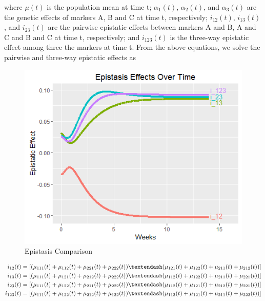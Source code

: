 \documentclass[11pt,]{book}
\theoremstyle{definition}
\theoremstyle{definition}
\theoremstyle{remark}
\begin{document}
where \(\mu(t)\) is the population mean at time t; \(\alpha_1(t)\),
\(\alpha_2(t)\), and \(\alpha_3(t)\) are the genetic effects of markers
A, B and C at time t, respectively; \(i_{12}(t)\), \(i_{13}(t)\), and
\(i_{23}(t)\) are the pairwise epistatic effects between markers A and
B, A and C and B and C at time t, respectively; and \(i_{123}(t)\) is
the three-way epistatic effect among three the markers at time t. From
the above equations, we solve the pairwise and three-way epistatic
effects as

\begin{figure}

{\centering \includegraphics[width=0.8\linewidth]{images/EpistasisComparison} 

}

\caption{Epistasis Comparison}\label{fig:epistasis-compare}
\end{figure}

\begin{align}
i_{12}(t) &=  [(\mu_{111}(t) + \mu_{112}(t) + \mu_{221}(t) + \mu_{222}(t)) – (\mu_{121}(t) + \mu_{122}(t) + \mu_{211}(t) + \mu_{212}(t))] \notag \\
i_{13}(t) &=  [(\mu_{111}(t) + \mu_{121}(t) + \mu_{212}(t) + \mu_{222}(t)) – (\mu_{112}(t) + \mu_{122}(t) + \mu_{211}(t) + \mu_{221}(t))] \notag \\
i_{23}(t) &=  [(\mu_{111}(t) + \mu_{122}(t) + \mu_{211}(t) + \mu_{222}(t)) – (\mu_{112}(t) + \mu_{121}(t) + \mu_{212}(t) + \mu_{221}(t))] \notag \\
i_{123}(t) &=  [(\mu_{111}(t) + \mu_{122}(t) + \mu_{212}(t) + \mu_{122}(t)) – (\mu_{112}(t) + \mu_{121}(t) + \mu_{211}(t) + \mu_{222}(t))]
\label{eq:epi-effects}
\end{align}
\end{document}
